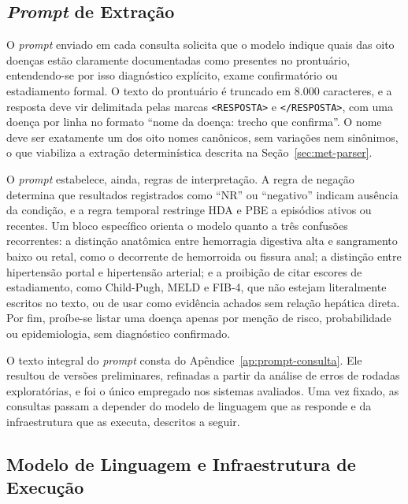 \subsection{\texorpdfstring{\textit{Prompt}}{Prompt} de Extração}\label{sec:met-prompt}

O \textit{prompt} enviado em cada consulta solicita que o modelo indique quais das oito doenças estão claramente documentadas como presentes no prontuário, entendendo-se por isso diagnóstico explícito, exame confirmatório ou estadiamento formal. O texto do prontuário é truncado em 8.000 caracteres, e a resposta deve vir delimitada pelas marcas \texttt{<RESPOSTA>} e \texttt{</RESPOSTA>}, com uma doença por linha no formato ``nome da doença: trecho que confirma''. O nome deve ser exatamente um dos oito nomes canônicos, sem variações nem sinônimos, o que viabiliza a extração determinística descrita na Seção~\ref{sec:met-parser}.

O \textit{prompt} estabelece, ainda, regras de interpretação. A regra de negação determina que resultados registrados como ``NR'' ou ``negativo'' indicam ausência da condição, e a regra temporal restringe HDA e PBE a episódios ativos ou recentes. Um bloco específico orienta o modelo quanto a três confusões recorrentes: a distinção anatômica entre hemorragia digestiva alta e sangramento baixo ou retal, como o decorrente de hemorroida ou fissura anal; a distinção entre hipertensão portal e hipertensão arterial; e a proibição de citar escores de estadiamento, como Child-Pugh, MELD e FIB-4, que não estejam literalmente escritos no texto, ou de usar como evidência achados sem relação hepática direta. Por fim, proíbe-se listar uma doença apenas por menção de risco, probabilidade ou epidemiologia, sem diagnóstico confirmado.

O texto integral do \textit{prompt} consta do Apêndice~\ref{ap:prompt-consulta}. Ele resultou de versões preliminares, refinadas a partir da análise de erros de rodadas exploratórias, e foi o único empregado nos sistemas avaliados. Uma vez fixado, as consultas passam a depender do modelo de linguagem que as responde e da infraestrutura que as executa, descritos a seguir.

\subsection{Modelo de Linguagem e Infraestrutura de Execução}\label{sec:met-modelo}

